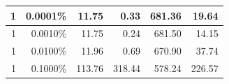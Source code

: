 \documentclass[12pt,a4paper]{report}
\begin{document}
\begin{table}[H]
\begin{tabular}{|r|r|r|r|r|r|}
1                                                                                               & 0.0001\%                                                                                             & 11.75                                                                                                 & 0.33                                                                                                                                & 681.36                                                                                                                                     & 19.64                                                                                                                             \\ \hline
1                                                                                               & 0.0010\%                                                                                             & 11.75                                                                                                 & 0.24                                                                                                                                & 681.50                                                                                                                                     & 14.15                                                                                                                             \\ \hline
1                                                                                               & 0.0100\%                                                                                             & 11.96                                                                                                 & 0.69                                                                                                                                & 670.90                                                                                                                                     & 37.74                                                                                                                             \\ \hline
1                                                                                               & 0.1000\%                                                                                             & 113.76                                                                                                & 318.44                                                                                                                              & 578.24                                                                                                                                     & 226.57                                                                                                                            \\ \hline

\end{tabular}
\end{table}
\end{document}
